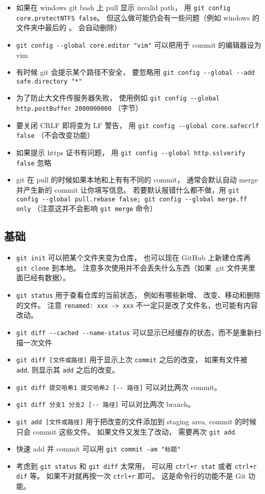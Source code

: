 \begin{itemize}
\item 如果在 windows git bash 上 pull 显示 invalid path， 用 \verb`git config core.protectNTFS false`。 但这么做可能仍会有一些问题（例如 windows 的文件夹中最后的 。 会自动删除）
\item \verb`git config --global core.editor "vim"` 可以把用于 commit 的编辑器设为 vim
\item 有时候 git 会提示某个路径不安全， 要忽略用 \verb`git config --global --add safe.directory "*"`
\item 为了防止大文件传服务器失败， 使用例如 \verb`git config --global http.postBuffer 2000000000` （字节）
\item 要关闭 CRLF 即将变为 LF 警告， 用 \verb`git config --global core.safecrlf false` （不会改变功能）
\item 如果提示 https 证书有问题， 用 \verb`git config --global http.sslverify false` 忽略
\item git 在 pull 的时候如果本地和上有有不同的 commit， 通常会默认自动 merge 并产生新的 commit 让你填写信息。 若要默认报错什么都不做，用 \verb`git config --global pull.rebase false; git config --global merge.ff only` （注意这并不会影响 \verb`git merge` 命令）
\end{itemize}

\subsection{基础}
\begin{itemize}
\item \verb`git init` 可以把某个文件夹变为仓库， 也可以现在 GitHub 上新建仓库再 \verb`git clone` 到本地。 注意多次使用并不会丢失什么东西（如果 .git 文件夹里面已经有数据）。
\item \verb`git status` 用于查看仓库的当前状态， 例如有哪些新增、 改变、移动和删除的文件。 注意 \verb`renamed: xxx -> xxx` 不一定只是改了文件名，也可能有内容改动。
\item \verb`git diff --cached --name-status` 可以显示已经缓存的状态，而不是重新扫描一次文件
\item \verb`git diff [文件或路径]` 用于显示上次 \verb`commit` 之后的改变， 如果有文件被 \verb`add`, 则显示其 \verb`add` 之后的改变。
\item \verb`git diff 提交哈希1 提交哈希2 [-- 路径]` 可以对比两次 commit。
\item \verb`git diff 分支1 分支2 [-- 路径]` 可以对比两次 branch。
\item \verb`git add [文件或路径]` 用于把改变的文件添加到 staging area, commit 的时候只会 commit 这些文件。 如果文件又发生了改动， 需要再次 \verb`git add`.
\item 快速 add 并 commit 可以用 \verb`git commit -am "标题"`
\item 考虑到 \verb`git status` 和 \verb`git diff` 太常用， 可以用 \verb`ctrl+r stat` 或者 \verb`ctrl+r dif` 等。 如果不对就再按一次 \verb`ctrl+r` 即可。 这是命令行的功能不是 Git 功能。
\end{itemize}

